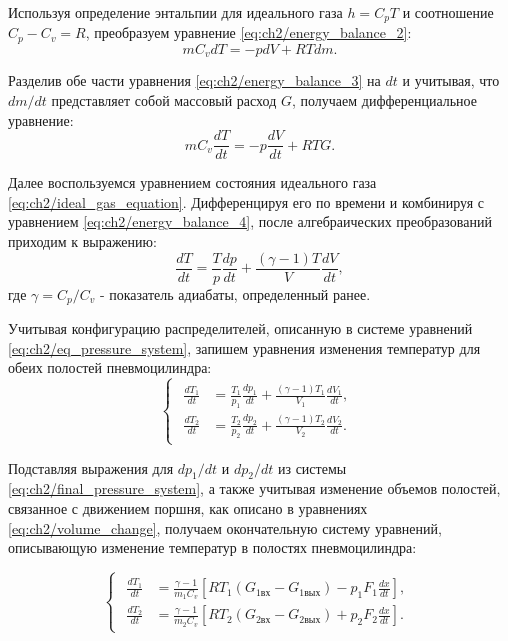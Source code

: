 Используя определение энтальпии для идеального газа $h = C_pT$ и соотношение $C_p - C_v = R$, преобразуем уравнение \eqref{eq:ch2/energy_balance_2}:
\begin{equation}\label{eq:ch2/energy_balance_3}
    mC_vdT = -pdV + RTdm.
\end{equation}

Разделив обе части уравнения \eqref{eq:ch2/energy_balance_3} на $dt$ и учитывая, что $dm/dt$ представляет собой массовый расход $G$, получаем дифференциальное уравнение:
\begin{equation}\label{eq:ch2/energy_balance_4}
    mC_v\frac{dT}{dt} = -p\frac{dV}{dt} + RTG.
\end{equation}

Далее воспользуемся уравнением состояния идеального газа \eqref{eq:ch2/ideal_gas_equation}. Дифференцируя его по времени и комбинируя с уравнением \eqref{eq:ch2/energy_balance_4}, после алгебраических преобразований приходим к выражению:
\begin{equation}\label{eq:ch2/energy_balance_5}
    \frac{dT}{dt} = \frac{T}{p}\frac{dp}{dt} + \frac{(\gamma-1)T}{V}\frac{dV}{dt},
\end{equation}
где $\gamma = C_p/C_v$ - показатель адиабаты, определенный ранее.

Учитывая конфигурацию распределителей, описанную в системе уравнений \eqref{eq:ch2/eq_pressure_system}, запишем уравнения изменения температур для обеих полостей пневмоцилиндра:
\begin{equation}\label{eq:ch2/energy_balance_6}
    \begin{cases}
        \begin{aligned}
            \frac{dT_1}{dt} & = \frac{T_1}{p_1}\frac{dp_1}{dt} + \frac{(\gamma-1)T_1}{V_1}\frac{dV_1}{dt}, \\
            \frac{dT_2}{dt} & = \frac{T_2}{p_2}\frac{dp_2}{dt} + \frac{(\gamma-1)T_2}{V_2}\frac{dV_2}{dt}.
        \end{aligned}
    \end{cases}
\end{equation}

Подставляя выражения для $dp_1/dt$ и $dp_2/dt$ из системы \eqref{eq:ch2/final_pressure_system}, а также учитывая изменение объемов полостей,
связанное с движением поршня, как описано в уравнениях \eqref{eq:ch2/volume_change}, получаем окончательную
систему уравнений, описывающую изменение температур в полостях пневмоцилиндра:

\begin{equation}\label{eq:ch2/energy_balance_final}
    \begin{cases}
        \begin{aligned}
            \frac{dT_1}{dt} & = \frac{\gamma-1}{m_1C_v}\left[RT_1(G_{1\text{вх}} - G_{1\text{вых}}) - p_1F_1\frac{dx}{dt}\right], \\
            \frac{dT_2}{dt} & = \frac{\gamma-1}{m_2C_v}\left[RT_2(G_{2\text{вх}} - G_{2\text{вых}}) + p_2F_2\frac{dx}{dt}\right].
        \end{aligned}
    \end{cases}
\end{equation}


